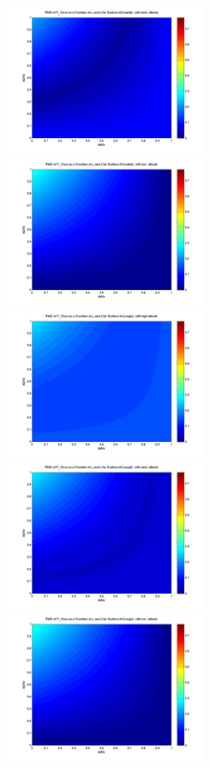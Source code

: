 \begin{description}
\begin{figure}[!ht]
\begin{minipage}[t]{200mm}
    \includegraphics[width=65mm]{figs/sda/F_z_error_albedo__med_surf__matte.jpg}
    \includegraphics[width=65mm]{figs/sda/F_z_error_albedo__low_surf__matte.jpg}
    \includegraphics[width=65mm]{figs/sda/F_z_error_albedo_high_surf__rough.jpg}
    \includegraphics[width=65mm]{figs/sda/F_z_error_albedo__med_surf__rough.jpg}
    \includegraphics[width=65mm]{figs/sda/F_z_error_albedo__low_surf__rough.jpg}

\end{minipage}
\end{figure}
\end{description}
